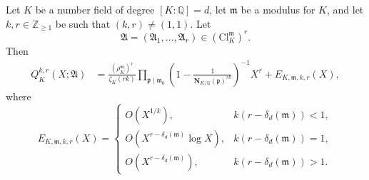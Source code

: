 \documentclass[10pt,a4paper]{amsart}
\newcommand{\Nrm}[2]{\mathbf{N}_{#1}(#2)}
\newcommand{\Q}{\mathbb{Q}}
\newcommand{\Z}{\mathbb{Z}}
\begin{document}
\begin{theorem}\label{thm:main-theorem-tuples}
Let $K$ be a number field of degree $[K:\Q]=d$, let
$\mathfrak{m}$ be a modulus for $K$, and let $k,r\in\Z_{\geq1}$
be such that $(k,r)\neq(1,1)$. Let
\[
\boldsymbol{\mathfrak{A}}
=
(\mathfrak{A}_1,\ldots,\mathfrak{A}_r)
\in
\left(\mathrm{Cl}_K^{\mathfrak{m}}\right)^r.
\]
Then
\begin{align}
Q_K^{k,r}(X;\boldsymbol{\mathfrak{A}})
&=
\frac{\left(\rho_K^{\mathfrak{m}}\right)^r}
{\zeta_K(rk)}
\prod_{\mathfrak{p}\mid\mathfrak{m}_0}
\left(
1-\frac{1}
{\Nrm{K/\Q}{\mathfrak{p}}^{rk}}
\right)^{-1}
X^r
+
E_{K,\mathfrak{m},k,r}(X),
\label{eqn:main-theorem-tuples-asymptotic}
\end{align}
where
\begin{equation}\label{eqn:main-theorem-tuples-error}
E_{K,\mathfrak{m},k,r}(X)
=
\begin{cases}
\displaystyle
O\left(X^{1/k}\right),
&
k\left(r-\delta_d(\mathfrak{m})\right)<1,
\\[8pt]
\displaystyle
O\left(
X^{r-\delta_d(\mathfrak{m})}\log X
\right),
&
k\left(r-\delta_d(\mathfrak{m})\right)=1,
\\[8pt]
\displaystyle
O\left(
X^{r-\delta_d(\mathfrak{m})}
\right),
&
k\left(r-\delta_d(\mathfrak{m})\right)>1.
\end{cases}
\end{equation}

\end{theorem}
\end{document}
